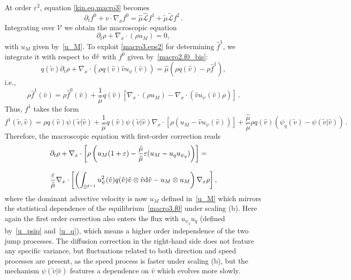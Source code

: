\documentclass[a4paper]{article}
\theoremstyle{Theorem}\newtheorem{proposition}{Proposition}[section]
\theoremstyle{Remark}\newtheorem{remark}{Remark}[section]
\theoremstyle{Theorem}\newtheorem{theorem}{Theorem}[section]
\newcommand{\hv}{\hat{v}}
\newcommand{\tv}{\tilde{v}}
\newcommand{\hf}{\hat{f}}
\newcommand{\hmu}{\hat{\mu}}
\newcommand{\tmu}{\tilde{\mu}}
\newcommand{\intS}{\int_{\mathbb{S}^{d-1}}}
\begin{document}
At order $\varepsilon^2$, equation \eqref{kin.eq.macro3} becomes
\begin{equation}\label{macro3.eps2}
    \partial_t f^0 +v\cdot \nabla_x f^0 = \hmu \hat{\mathcal{L}}f^1+\tmu \tilde{\mathcal{L}}f^2\,.
\end{equation}
Integrating over $\mathcal{V}$ we obtain the macroscopic equation
\begin{equation*}\label{macro3.govern}
    \partial_t \rho +\nabla_x \cdot (\rho u_M)=0,
\end{equation*}
with $u_M$ given by~\eqref{u_M}. To exploit \eqref{macro3.eps2} for determining $\hf^1$, we integrate it with respect to ${\rm d} \tv$ with $f^0$ given by~\eqref{macro2.f0_bis}:
\[
q(\tv)\partial_t \rho  +\nabla_x \cdot \left(\rho q(\hv)\hv u_\psi(\hv)  \right) = \hmu \left(\rho q(\hv) - \rho \hf^1\right),
\]
i.e., 
\[
\rho \hf^1(\hv)=\rho\hf^0(\hv)+\dfrac{1}{\hmu}q(\hv)\left[\nabla_x \cdot(\rho u_M) -\nabla_x\cdot (\hv u_\psi(\hv)\rho)\right]\,.
\]
Thus, $f^1$ takes the form
\begin{equation*}
    f^1(\tv,\hv)= \rho q(\hv)\psi(\tv|\hv)+\dfrac{1}{\hmu}q(\hv)\psi(\tv|\hv)\nabla_x\cdot \left[\rho(u_M-\hv u_\psi(\hv))\right] +\dfrac{\hmu}{\tmu}\rho q(\hv) \left(\psi_q(\tv)-\psi(\tv|\hv)\right)  \,.  
\end{equation*}
Therefore, the macroscopic equation with first-order correction reads
\begin{equation}\label{macro3.govern_corr}
\begin{split}
    &\partial_t \rho +\nabla_x \cdot \left[\rho \left(u_M(1+\varepsilon)-\dfrac{\hmu}{\tmu}\varepsilon(u_M-u_qu_{\psi_q})\right)\right]=\\[0.3cm]
    &\dfrac{\varepsilon}{\hmu}\nabla_x \cdot \left[\left(\intS u_\psi^2(\hv)q(\hv)\hv\otimes\hv{\rm d}\hv- u_M\otimes u_M\right) \nabla_x\rho\right],
    \end{split}
\end{equation}
where the dominant advective velocity is now $u_M$ defined in~\eqref{u_M} which mirrors the statistical dependence of the equilibrium~\eqref{macro3.f0} under scaling (b). Here again  the first order correction also enters the flux with $u_{\psi_q}u_q$ (defined by~\eqref{u_psiq} and~\eqref{u_q}), which means a higher order independence of the two jump processes. The diffusion correction in the right-hand side does not feature any specific variance, but fluctuations related to both  direction and speed processes are present, as the speed process is faster under scaling (b), but the mechanism $\psi(\tv|\hv)$ features a dependence on $\hv$ which evolves more slowly. 
\end{document}
